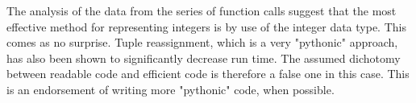 The analysis of the data from the series of function calls suggest that the most effective method for representing integers is by use of the integer data type. This comes as no surprise. Tuple reassignment, which is a very "pythonic" approach, has also been shown to significantly decrease run time. The assumed dichotomy between readable code and efficient code is therefore a false one in this case. This is an endorsement of writing more "pythonic" code, when possible.
